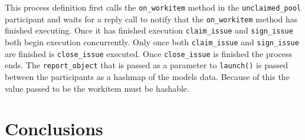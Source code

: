 \documentclass[document.tex]{subfiles}
\begin{document}
This process definition first calls the \verb!on_workitem! method in the \verb!unclaimed_pool! participant and waits for a reply call to notify that the \verb!on_workitem! method has finished executing. Once it has finished execution \verb!claim_issue! and \verb!sign_issue! both begin execution concurrently. Only once both \verb!claim_issue! and \verb!sign_issue! are finished is \verb!close_issue! executed. Once \verb!close_issue! is finished the process ends. The \verb!report_object! that is passed as a parameter to \verb!launch()! is passed between the participants as a hashmap of the models data. Because of this the value passed to be the workitem must be hashable.

\section {Conclusions}
\end{document}
